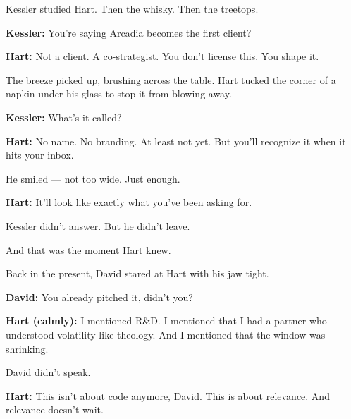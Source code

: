 Kessler studied Hart. Then the whisky. Then the treetops.

\textbf{Kessler:}  
You’re saying Arcadia becomes the first client?

\textbf{Hart:}  
Not a client. A co-strategist.  
You don’t license this. You shape it.

The breeze picked up, brushing across the table. Hart tucked the corner of a napkin under his glass to 
stop it from blowing away.  

\textbf{Kessler:}  
What’s it called?

\textbf{Hart:}  
No name. No branding.  
At least not yet.
But you’ll recognize it when it hits your inbox.

He smiled — not too wide. Just enough.

\textbf{Hart:}  
It’ll look like exactly what you’ve been asking for.

Kessler didn’t answer.  
But he didn’t leave.

And that was the moment Hart knew.

Back in the present, David stared at Hart with his jaw tight.  

\textbf{David:}  
You already pitched it, didn’t you?

\textbf{Hart (calmly):}  
I mentioned R\&D.  
I mentioned that I had a partner who understood volatility like theology.  
And I mentioned that the window was shrinking.

David didn’t speak. 

\textbf{Hart:}  
This isn’t about code anymore, David.  
This is about relevance.  
And relevance doesn’t wait.

\medskip

